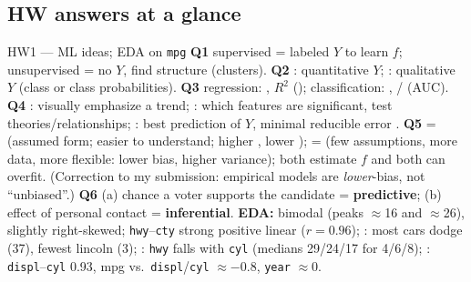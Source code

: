 \subsection{HW answers at a glance}
\begin{topic}{HW1 --- ML ideas; EDA on \texttt{mpg} }
\textbf{Q1} supervised = labeled $Y$ to learn $f$; unsupervised = no $Y$, find structure (clusters).
\textbf{Q2} : quantitative $Y$; : qualitative $Y$ (class or class probabilities).
\textbf{Q3} regression: , $R^2$ (); classification: , / (AUC).
\textbf{Q4} : visually emphasize a trend; : which features are significant,
test theories/relationships; : best prediction of $Y$, minimal reducible error .
\textbf{Q5}  =  (assumed form; easier to understand; higher , lower );
 =  (few assumptions, more data, more flexible: lower bias, higher variance); both
estimate $f$ and both can overfit. (Correction to my submission: empirical models are \emph{lower}-bias, not ``unbiased''.)
\textbf{Q6} (a) chance a voter supports the candidate = \textbf{predictive}; (b) effect of personal contact = \textbf{inferential}.
\textbf{EDA:}   bimodal (peaks $\approx$16 and $\approx$26), slightly right-skewed; \texttt{hwy}--\texttt{cty}
 strong positive linear ($r=0.96$); : most cars dodge (37), fewest lincoln (3); : \texttt{hwy} falls with \texttt{cyl}
(medians 29/24/17 for 4/6/8);  : \texttt{displ}--\texttt{cyl} 0.93, mpg vs.\ \texttt{displ}/\texttt{cyl}
$\approx -0.8$, \texttt{year} $\approx 0$.
\end{topic}

